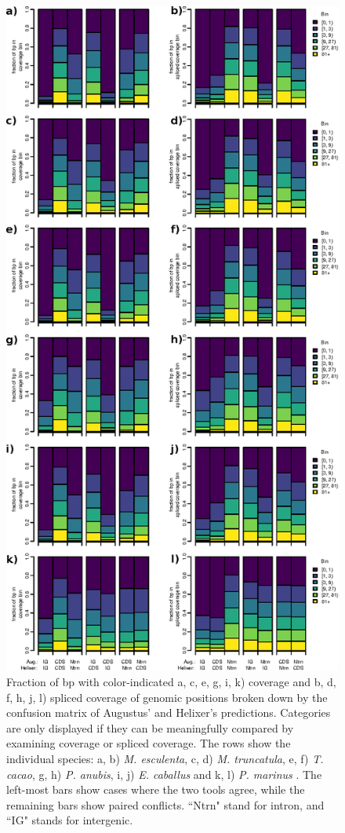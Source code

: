 \documentclass{article}
\begin{document}
\begin{figure}[!h]
\renewcommand\thefigure{S12}
\centerline{\includegraphics[]{images/cov_examples/each_sp_vs_augustus}}
\caption{
Fraction of bp with color-indicated a, c, e, g, i, k) coverage and b, d, f, h, j, l) spliced coverage of genomic positions
broken down by the confusion matrix of Augustus' and Helixer's predictions. Categories
are only displayed if they can be meaningfully compared by examining coverage or spliced
coverage. The rows show the individual species: a, b) {\it M. esculenta}, c, d) {\it M. truncatula}, 
e, f) {\it T. cacao}, g, h) {\it P. anubis}, i, j) {\it E. caballus} and k, l) {\it P. marinus} . 
The left-most bars show cases where the two tools agree,
while the remaining bars show paired conflicts. ``Ntrn" stand
for intron, and ``IG" stands for intergenic.
}
\end{figure}
\end{document}
